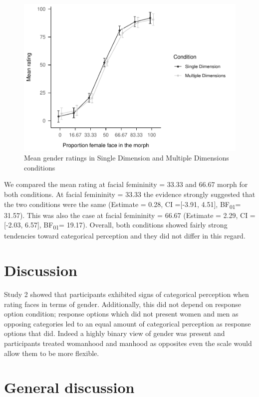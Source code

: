 \documentclass[
  man]{apa7}
\begin{document}
\begin{figure}
\centering
\includegraphics{resp_opts_manus23022_files/figure-latex/exp-two-inf-1.pdf}
\caption{\label{fig:exp-two-inf}Mean gender ratings in Single Dimension and Multiple Dimensions conditions}
\end{figure}

We compared the mean rating at facial femininity = 33.33 and 66.67 morph for both conditions. At facial femininity = 33.33 the evidence strongly suggested that the two conditions were the same
(Estimate = 0.28, CI ={[}-3.91, 4.51{]}, BF\textsubscript{01}= 31.57). This was also the case at facial femininity = 66.67
(Estimate = 2.29, CI ={[}-2.03, 6.57{]}, BF\textsubscript{01}= 19.17). Overall, both conditions showed fairly strong tendencies toward categorical perception and they did not differ in this regard.

\hypertarget{discussion-1}{%
\section{Discussion}\label{discussion-1}}

Study 2 showed that participants exhibited signs of categorical perception when rating faces in terms of gender. Additionally, this did not depend on response option condition; response options which did not present women and men as opposing categories led to an equal amount of categorical perception as response options that did. Indeed a highly binary view of gender was present and participants treated womanhood and manhood as opposites even the scale would allow them to be more flexible.

\hypertarget{general-discussion}{%
\section{General discussion}\label{general-discussion}}
\end{document}
